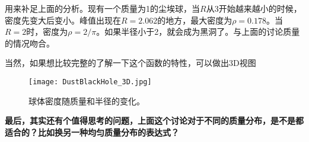 \documentclass[12pt,a4paper]{article}
\begin{document}
用来补足上面的分析。现有一个质量为1的尘埃球，当$R$从3开始越来越小的时候，密度先变大后变小。峰值出现在$R=2.062$的地方，最大密度为$\rho=0.178$。当$R=2$时，密度为$\rho=2/\pi$。如果半径小于2，就会成为黑洞了。与上面的讨论质量的情况吻合。


当然，如果想比较完整的了解一下这个函数的特性，可以做出3D视图
\begin{figure}[!htbp]
\centering
\texttt{[image: DustBlackHole\_3D.jpg]}
\caption{球体密度随质量和半径的变化。}\label{fig:FixM}
\end{figure}


\vspace{3em}


\bf 最后，其实还有个值得思考的问题，上面这个讨论对于不同的质量分布，是不是都适合的？比如换另一种均匀质量分布的表达式？
\end{document}
